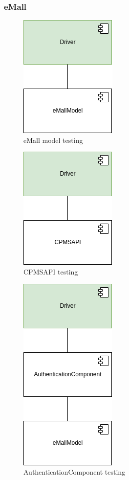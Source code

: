\subsubsection{eMall}
\begin{figure}[H]
    \centering
    \includegraphics[keepaspectratio]{Testing/emall/emallModel.drawio.png}
    \caption{\ac{eMall} model testing}
\end{figure}
\begin{figure}[H]
    \centering
    \includegraphics[keepaspectratio]{Testing/emall/cpmsapi.png}
    \caption{\ac{CPMS}\ac{API} testing}
\end{figure}
\begin{figure}[H]
    \centering
    \includegraphics[keepaspectratio]{Testing/emall/authentication.drawio.png}
    \caption{AuthenticationComponent testing}
\end{figure}
